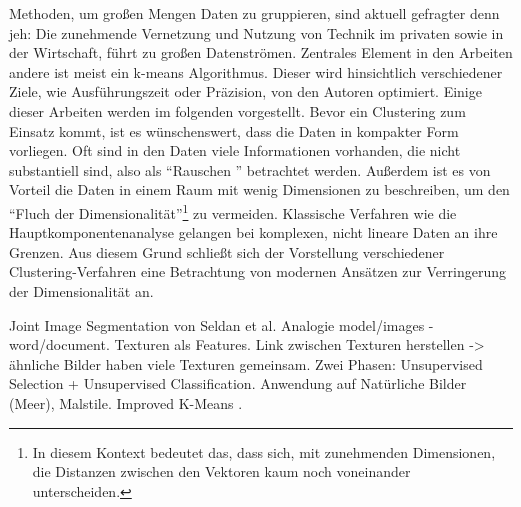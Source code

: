 Methoden, um großen Mengen Daten zu gruppieren, sind aktuell gefragter denn jeh: Die zunehmende Vernetzung und Nutzung von Technik im privaten sowie in der Wirtschaft, führt zu großen Datenströmen. Zentrales Element in den Arbeiten andere ist meist ein k-means Algorithmus. Dieser wird hinsichtlich verschiedener Ziele, wie Ausführungszeit oder Präzision, von den Autoren optimiert.  Einige dieser Arbeiten werden im folgenden vorgestellt.\newline
Bevor ein Clustering zum Einsatz kommt, ist es wünschenswert, dass die Daten in kompakter Form vorliegen. Oft sind in den Daten viele Informationen vorhanden, die nicht substantiell sind, also als \enquote{Rauschen } betrachtet werden. Außerdem ist es von Vorteil die Daten in einem Raum mit wenig Dimensionen zu beschreiben, um den \enquote{Fluch der Dimensionalität}\footnote{In diesem Kontext bedeutet das, dass sich, mit zunehmenden Dimensionen, die Distanzen zwischen den Vektoren kaum noch voneinander unterscheiden.} zu vermeiden. Klassische Verfahren wie die Hauptkomponentenanalyse gelangen bei komplexen, nicht lineare Daten an ihre Grenzen. Aus diesem Grund schließt sich der Vorstellung verschiedener Clustering-Verfahren eine Betrachtung von modernen Ansätzen zur Verringerung der Dimensionalität an.\newline

Joint Image Segmentation von Seldan \cite{jis2003} et al. Analogie model/images - word/document. Texturen als Features. Link zwischen Texturen herstellen -> ähnliche Bilder haben viele Texturen gemeinsam. Zwei Phasen: Unsupervised Selection + Unsupervised Classification. Anwendung auf Natürliche Bilder (Meer), Malstile.\newline
Improved K-Means \cite{ikm2010}. %

 \cite{bok2004}

